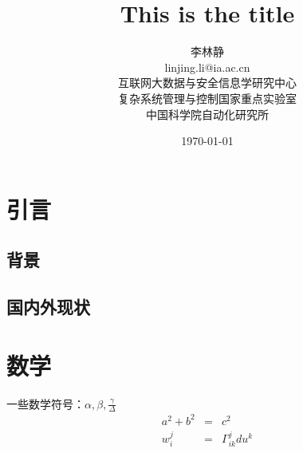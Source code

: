 \documentclass[a4paper,12pt]{article}
\begin{document}
\title{This is the title}
\author{
	李林静\\
	linjing.li@ia.ac.cn\\
	互联网大数据与安全信息学研究中心\\
	复杂系统管理与控制国家重点实验室\\
	中国科学院自动化研究所
	}
\date{\today}

\maketitle

\section{引言}

\subsection{背景}

\subsection{国内外现状}


\section{数学}

一些数学符号：$\alpha,\beta,\frac{\gamma}{\Delta}$
\begin{eqnarray}
	a^2 + b^2 &=& c^2 \\
	w_i^j &=& \Gamma_{ik}^jdu^k
\end{eqnarray}


\appendix
\end{document}
